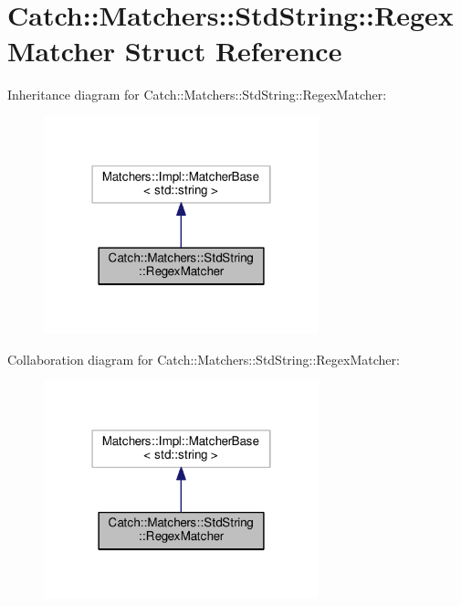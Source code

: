 \hypertarget{structCatch_1_1Matchers_1_1StdString_1_1RegexMatcher}{}\section{Catch\+:\+:Matchers\+:\+:Std\+String\+:\+:Regex\+Matcher Struct Reference}
\label{structCatch_1_1Matchers_1_1StdString_1_1RegexMatcher}


Inheritance diagram for Catch\+:\+:Matchers\+:\+:Std\+String\+:\+:Regex\+Matcher\+:\nopagebreak
\begin{figure}[H]
\begin{center}
\leavevmode
\includegraphics[width=226pt]{structCatch_1_1Matchers_1_1StdString_1_1RegexMatcher__inherit__graph}
\end{center}
\end{figure}


Collaboration diagram for Catch\+:\+:Matchers\+:\+:Std\+String\+:\+:Regex\+Matcher\+:\nopagebreak
\begin{figure}[H]
\begin{center}
\leavevmode
\includegraphics[width=226pt]{structCatch_1_1Matchers_1_1StdString_1_1RegexMatcher__coll__graph}
\end{center}
\end{figure}
